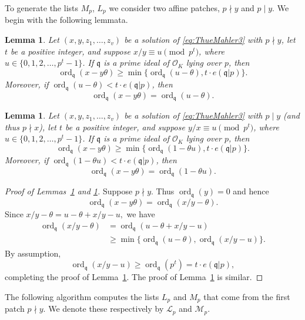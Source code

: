 \documentclass[11pt]{report}
\newtheorem{lemma}[theorem]{Lemma}
\theoremstyle{definition}
\DeclareMathOperator{\ord}{ord}
\begin{document}
To generate the lists $M_p$, $L_p$ we consider two affine patches, $p \nmid y$ and $p \mid y$. We begin with the following lemmata.

\begin{lemma} \label{lem:AffinePatch1}
Let $(x,y,z_1, \dots, z_v)$ be a solution of \eqref{eq:ThueMahler3} with $p \nmid y$, let $t$ be a positive integer, and suppose $x/y \equiv u \pmod{p^t}$, where ${u \in \{0,1,2,\dotsc,p^{t}-1\}}$. If $\mathfrak{q}$ is a prime ideal of $\mathcal{O}_K$ lying over $p$, then
\[\ord_{\mathfrak{q}}(x-y\theta)\ge \min\{\ord_{\mathfrak{q}}(u-\theta), t \cdot e(\mathfrak{q}|p)\}.\]
Moreover, if $\ord_{\mathfrak{q}}(u-\theta) < t \cdot e(\mathfrak{q}|p)$, then
\[\ord_\mathfrak{q}(x-y\theta) = \ord_{\mathfrak{q}}(u-\theta).\]
\end{lemma}

\begin{lemma} \label{lem:AffinePatch2}
Let $(x,y,z_1, \dots, z_v)$ be a solution of \eqref{eq:ThueMahler3} with $p \mid y$ (and thus $p \nmid x$), let $t$ be a positive integer, and suppose $y/x \equiv u \pmod{p^t}$, where $u \in \{0,1,2,\dotsc,p^{t}-1\}$. If $\mathfrak{q}$ is a prime ideal of $\mathcal{O}_K$ lying over $p$, then
\[\ord_{\mathfrak{q}}(x-y\theta)\ge \min\{\ord_{\mathfrak{q}}(1-\theta u), t \cdot e(\mathfrak{q}|p)\}.\]
Moreover, if $\ord_{\mathfrak{q}}(1-\theta u) < t \cdot e(\mathfrak{q}|p)$, then
\[\ord_\mathfrak{q}(x-y\theta) = \ord_{\mathfrak{q}}(1 - \theta u).\]
\end{lemma}

\begin{proof}[Proof of Lemmas~\ref{lem:AffinePatch1} and \ref{lem:AffinePatch2}]
Suppose $p \nmid y$. Thus $\ord_{\mathfrak{q}}(y) = 0$ and hence
\[\ord_{\mathfrak{q}}(x-y\theta) = \ord_{\mathfrak{q}}(x/y - \theta).\]
Since $x/y-\theta = u - \theta + x/y - u,$ we have
\[\begin{array}{ll}
\ord_\mathfrak{q}(x/y-\theta)	& = \ord_{\mathfrak{q}}(u - \theta + x/y - u) \\
						& \geq \min\{\ord_{\mathfrak{q}}(u - \theta), \ord_{\mathfrak{q}}(x/y - u)\}.
\end{array}\]
By assumption,
\[\ord_{\mathfrak{q}}(x/y-u) \geq \ord_{\mathfrak{q}}(p^t) = t \cdot e(\mathfrak{q}|p),\]
completing the proof of Lemma~\ref{lem:AffinePatch1}. The proof of Lemma~\ref{lem:AffinePatch2} is similar.
\end{proof}

The following algorithm computes the lists $L_p$ and $M_p$ that come from the first patch $p \nmid y$. We denote these respectively by $\mathcal{L}_p$ and $\mathcal{M}_p$.
\end{document}
